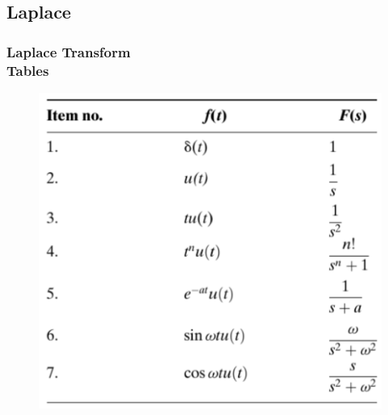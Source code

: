 \documentclass[hyperref={pdfpagelabels=true}]{beamer}
\begin{document}
\subsection{Laplace}
\begin{frame}
\frametitle{Laplace Transform \\ {\large Tables}}
\begin{figure}[!tbp]
\centering
\includegraphics[scale = 0.46]{figs/Selection_014.png}
\end{figure}
\end{frame}
\end{document}

